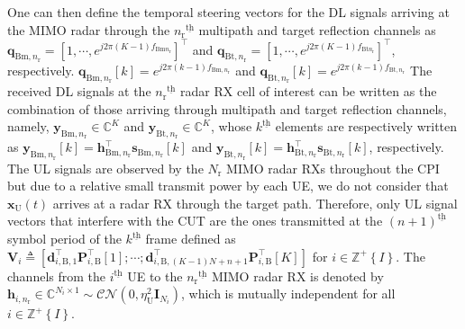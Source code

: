 \documentclass[conference]{IEEEtran}
\newcommand{\paren}[1]{\left({#1}\right)}
\newcommand{\bracket}[1]{{\left [{#1}\right ]}}
\newcommand{\braces}[1]{{\left\{ {#1}\right\}}}
\newcommand{\ith}[1]    {{#1}^{\underline{\text{th}}}}
\newcommand{\rr}{_\mathrm{r}}
\newcommand{\target}{\mathrm{t}}
\begin{document}
	One can then define the temporal steering vectors for the DL signals arriving at the MIMO radar through the $\ith{n\rr}$ multipath and target reflection channels as $\mathbf{q}_{\mathrm{Bm},n\rr}=\bracket{1,\cdots,e^{j2\pi(K-1) f_{\mathrm{Bm}n_\mathrm{r}}}}^\top$ and $\mathbf{q}_{\mathrm{Bt},n\rr}=\bracket{1,\cdots,e^{j2\pi(K-1) f_{\mathrm{Bt}n_\mathrm{r}}}}^\top$, respectively. $\mathbf{q}_{\mathrm{Bm},n\rr}\bracket{k}=e^{j2\pi\paren{k-1}f_{\mathrm{Bm},n\rr}}$ and $\mathbf{q}_{\mathrm{Bt},n\rr}\bracket{k}=e^{j2\pi\paren{k-1}f_{\mathrm{Bt},n\rr}}$
The received DL signals at the $\ith{n\rr}$ radar RX cell of interest can be written as the combination of those arriving through multipath and target reflection channels, namely, $\mathbf{y}_{\mathrm{Bm},n\rr}\in\mathbb{C}^{K}$ and $\mathbf{y}_{\mathrm{Bt},n\rr}\in\mathbb{C}^K$, whose $\ith{k}$ elements are respectively written as $\mathbf{y}_{\mathrm{Bm},n\rr}\bracket{k}=\mathbf{h}^\top_{\mathrm{Bm},n\rr}\mathbf{s}_{\mathrm{Bm},n\rr}\bracket{k}$ and $\mathbf{y}_{\mathrm{Bt},n\rr}\bracket{k}=\mathbf{h}^\top_{\mathrm{Bt},n\rr}\mathbf{s}_{\mathrm{Bt},n\rr}\bracket{k}$, respectively. The UL signals are observed by the $N\rr$ MIMO radar RXs throughout the CPI but due to a relative small transmit power by each UE, we do not consider that $\mathbf{x}_{\mathrm{U}}(t)$ arrives at a radar RX through the target path. Therefore, only UL signal vectors that interfere with the CUT are the ones transmitted at the $\ith{\paren{n+1}}$ symbol period of the $\ith{k}$ frame defined as $\mathbf{V}_{i}\triangleq\bracket{\mathbf{d}^\top_{i,\mathrm{B},1}\mathbf{P}^\top_{i,\mathrm{B}}\bracket{1};\cdots;\mathbf{d}^\top_{i,\mathrm{B},(K-1)N+n+1}\mathbf{P}^\top_{i,\mathrm{B}}\bracket{K}}$ for $i\in\mathbb{Z}^+\braces{I}$. The channels from the $\ith{i}$ UE to the $\ith{n\rr}$ MIMO radar RX is denoted by $\mathbf{h}_{i,n\rr}\in\mathbb{C}^{N_i\times 1}\sim\mathcal{CN}\paren{0,\eta^2_\mathrm{U}\mathbf{I}_{N_i}}$, which is mutually independent for all $i\in\mathbb{Z}^+\braces{I}$.
\end{document}
